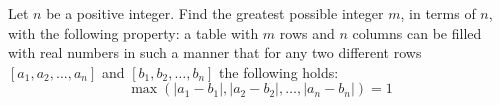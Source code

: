 Let $n$ be a positive integer. Find the greatest possible integer $m$, in terms of $n$, with the following property: a table with $m$ rows and $n$ columns can be filled with real numbers in such a manner that for any two different rows $\left[a_1,a_2,\ldots,a_n\right]$ and $\left[b_1,b_2,\ldots,b_n\right]$ the following holds: \[\max\left(\left|a_1-b_1\right|,\left|a_2-b_2\right|,\ldots,\left|a_n-b_n\right|\right)=1\]